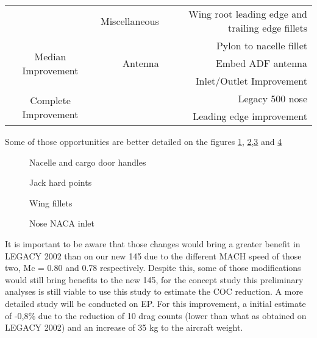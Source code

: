 \begin{table}[htbp]
\begin{tabular}{crr}
          & Miscellaneous & Wing root leading edge and trailing edge fillets \\
    \multirow{3}[6]{*}{Median Improvement} &       & Pylon to nacelle fillet \\
          & Antenna & Embed ADF antenna \\
          &       & Inlet/Outlet Improvement \\
    \multirow{2}[4]{*}{Complete Improvement} &       & Legacy 500 nose \\
          &       & Leading edge improvement \\
    \bottomrule
    \end{tabular}%
  \label{tab:simpleaerodinamicchanges}%
\end{table}%

Some of those opportunities are better detailed on the figures \ref{fig:Nacelleandcargodoorhandles}, \ref{fig:Jackhardpoints},\ref{fig:Wingfillets} and \ref{fig:NoseNACAinlet}

\begin{figure}[H] %
\caption{Nacelle and cargo door handles}
\label{fig:Nacelleandcargodoorhandles}
\end{figure}

\begin{figure}[H] %
\caption{Jack hard points}
\label{fig:Jackhardpoints}
\end{figure}

\begin{figure}[H] %
\caption{Wing fillets}
\label{fig:Wingfillets}
\end{figure}

\begin{figure}[H] %
\caption{Nose NACA inlet}
\label{fig:NoseNACAinlet}
\end{figure}

It is important to be aware that those changes would bring a greater benefit in LEGACY 2002 than on our new 145 due to the different MACH speed of those two, Mc = 0.80 and 0.78 respectively. Despite this, some of those modifications would still bring benefits to the new 145, for the concept study this preliminary analyses is still viable to use this study to estimate the COC reduction. A more detailed study will be conducted on EP.
For this improvement, a initial estimate of -0,8\% due to the reduction of 10 drag counts (lower than what as obtained on LEGACY 2002) and an increase of 35 kg to the aircraft weight.


